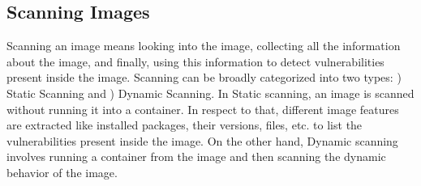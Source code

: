\documentclass[a4paper,num-refs]{oup-contemporary}
\newcommand{\rom}[1]{\lowercase\expandafter{\romannumeral #1\relax}}
\newcommand{\TG}[1]{\color{blue}From Tristan: #1\color{black}}
\begin{document}
%
%
%
%


\subsection{Scanning Images}

Scanning an image means looking into the image, collecting all the information about the image, and
finally, using this information to detect vulnerabilities present inside the image.
Scanning can be broadly categorized into two types: \rom{1}) Static Scanning and \rom{2})
Dynamic Scanning.
In Static scanning, an image is scanned without running it into a container. In respect to that,
different image features are extracted like installed packages, their versions, files, etc. to list
the vulnerabilities present inside the image.
On the other hand, Dynamic scanning involves running a container from the image and then scanning the
dynamic behavior of the image.
\end{document}
